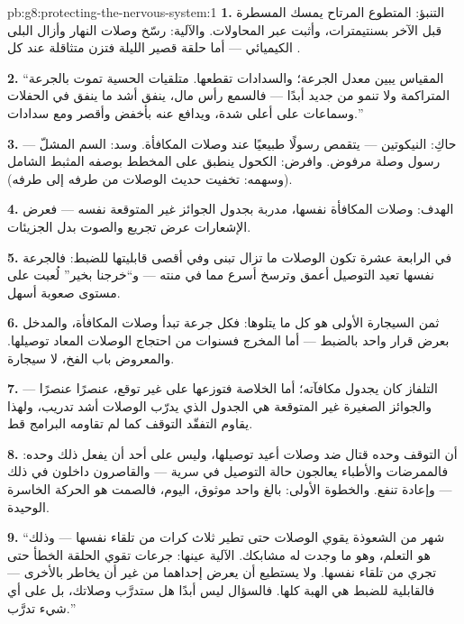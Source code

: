 \begin{solution}{pb:g8:protecting-the-nervous-system:1}
\textbf{1.} التنبؤ: المتطوع المرتاح يمسك المسطرة قبل
الآخر بسنتيمترات، وأثبت عبر المحاولات. والآلية: 
رسّخ وصلات النهار وأزال البلى الكيميائي --- أما حلقة
قصير الليلة فتزن متثاقلة عند كل .

\textbf{2.} ``المقياس يبين معدل الجرعة؛ والسدادات
تقطعها. متلقيات  الحسية تموت بالجرعة المتراكمة ولا
تنمو من جديد أبدًا --- فالسمع رأس مال، ينفق أشد ما ينفق
في الحفلات وسماعات  على أعلى شدة، ويدافع عنه بأخفض
وأقصر ومع سدادات.''

\textbf{3.} حاكِ: النيكوتين --- يتقمص رسولًا طبيعيًا عند
وصلات المكافأة. وسد: السم المشلّ --- رسول وصلة 
مرفوض. وافرض: الكحول ينطبق على المخطط بوصفه المثبط
الشامل (وسهمه: تخفيت حديث الوصلات من طرفه إلى طرفه).

\textbf{4.} الهدف: وصلات المكافأة نفسها، مدربة بجدول
الجوائز غير المتوقعة نفسه --- فعرض الإشعارات عرض تجريع
 والصوت بدل الجزيئات.

\textbf{5.} في الرابعة عشرة تكون الوصلات ما تزال تبنى
وفي أقصى قابليتها للضبط: فالجرعة نفسها تعيد التوصيل
أعمق وترسخ أسرع مما في  منته --- و``خرجنا بخير''
لُعبت على مستوى صعوبة أسهل.

\textbf{6.} ثمن السيجارة الأولى هو كل ما يتلوها: فكل
جرعة تبدأ  وصلات المكافأة، والمدخل بعرض قرار واحد
بالضبط --- أما المخرج فسنوات من احتجاج الوصلات المعاد
توصيلها. والمعروض باب الفخ، لا سيجارة.

\textbf{7.} التلفاز كان يجدول مكافآته؛ أما الخلاصة
فتوزعها على غير توقع، عنصرًا عنصرًا --- والجوائز
الصغيرة غير المتوقعة هي الجدول الذي يدرّب الوصلات أشد
تدريب، ولهذا يقاوم التفقّد التوقف كما لم تقاومه البرامج
قط.

\textbf{8.} أن التوقف وحده قتال ضد وصلات أعيد توصيلها،
وليس على أحد أن يفعل ذلك وحده: فالممرضات والأطباء
يعالجون حالة التوصيل في سرية --- والقاصرون داخلون في
ذلك --- وإعادة  تنفع. والخطوة الأولى: بالغ واحد
موثوق، اليوم، فالصمت هو الحركة الخاسرة الوحيدة.

\textbf{9.} ``شهر من الشعوذة يقوي الوصلات حتى تطير ثلاث
كرات من تلقاء نفسها --- وذلك هو التعلم، وهو ما وجدت له
مشابكك.  الآلية عينها: جرعات تقوي الحلقة الخطأ
حتى تجري من تلقاء نفسها. ولا يستطيع  أن يعرض
إحداهما من غير أن يخاطر بالأخرى --- فالقابلية للضبط هي
الهبة كلها. فالسؤال ليس أبدًا هل ستدرَّب وصلاتك، بل على
أي شيء تدرَّب.''


\end{solution}
